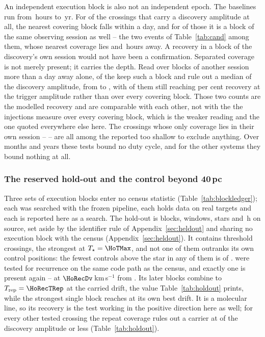 An independent execution block is also not an independent epoch. The baselines run from \RcSepMinH\,hours to \RcSepMaxYr\,yr. For
\RcNSepSameDay{} of the \RcNExclPoss{} crossings that carry a discovery
amplitude at all, the nearest covering block falls within a day, and for
\QcNHazard{} of those it is a block of the same observing session as well --
the two events of Table~\ref{tab:cand} among them, whose nearest coverage lies
\QcEvSepOneH{} and \QcEvSepTwoH\,hours away. A recovery in a block of the
discovery's own session would not have been a confirmation. Separated coverage is not merely present; it carries the depth. Read over
blocks of another session more than a day away alone, \SpNSep{} of the
\RcNExcl{} keep such a block and rule out a median \SpFracMed{} of the
discovery amplitude, from \SpFracMin{} to \SpFracMax, with \SpNPower{} of
them still reaching \RcPowerLevel{} per cent recovery at the trigger
amplitude rather than \RqNPowerHi{} over every covering block. Those two
counts are the modelled recovery and are comparable with each other, not
with the \HjNPowerHi{} the injections measure over every covering block,
which is the weaker reading and the one quoted everywhere else here.
The \QfNExclSameOnlyWord{} crossings whose
only coverage lies in their own session -- \SpNoSepList{} -- are all among
the \HjNPowerLo{} reported too shallow to exclude anything.
Over months and years these tests
bound no duty cycle, and for the other \ZcNoRepSys{} systems they bound
nothing at all.

\subsubsection{The reserved hold-out and the control beyond 40\,pc}
\label{sec:holdoutsearch}

Three sets of execution blocks enter no census statistic
(Table~\ref{tab:blockledger}); each was searched with the frozen pipeline, each
holds data on real targets and each is reported here as a search. The hold-out is \HoNBlock{} blocks, \HoNWin{} windows, \HoNStar{} stars
and \HoHours\,h on source, set aside by the identifier rule of
Appendix~\ref{sec:heldout} and sharing no execution block with the census
(Appendix~\ref{sec:heldout}). It contains \HoNCross{} threshold crossings,
the strongest at $T_\star=\HoTMax$, and not one of them outranks its own
control positions: the fewest controls above the star in any of them is
\HoNCtrlMin{} of \NCtrl. \HoNTested{} were tested for recurrence on the same
code path as the census, and exactly one is present again -- \HoRecStar{} at
$\HoRecDv$\,km\,s$^{-1}$ from \HoRecLine. Its \HoRecNRep{} later blocks
combine to $T_{\rm rep}=\HoRecTRep$ at the carried drift, the value
Table~\ref{tab:holdout} prints, while the strongest single block reaches
\HoRecTAnyDrift{} at its own best drift. It is a molecular line, so its
recovery is the test working in the positive direction here as well; for
every other tested crossing the repeat coverage rules out a carrier at
\HoFracMax{} of the discovery amplitude or less (Table~\ref{tab:holdout}).


